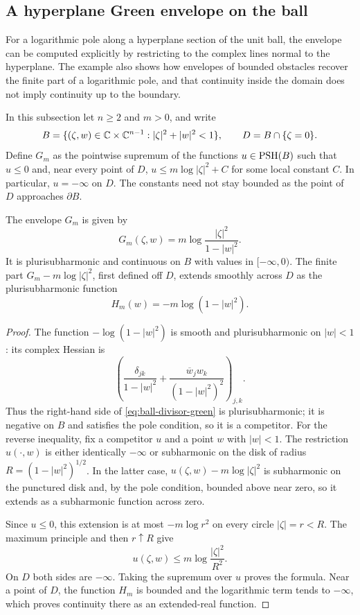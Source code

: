 \subsection{A hyperplane Green envelope on the ball}
\label{subsec:ball-divisor-green}

For a logarithmic pole along a hyperplane section of the unit ball, the envelope can be computed explicitly by restricting to the complex lines normal to the hyperplane. The example also shows how envelopes of bounded obstacles recover the finite part of a logarithmic pole, and that continuity inside the domain does not imply continuity up to the boundary.

In this subsection let $n\geq2$ and $m>0$, and write
\[
 B=\{(\zeta,w)\in\mathbb C\times\mathbb C^{n-1}:|\zeta|^2+|w|^2<1\},
 \qquad D=B\cap\{\zeta=0\}.
\]
Define $G_m$ as the pointwise supremum of the functions $u\in\mathrm{PSH}(B)$ such that $u\leq0$ and, near every point of $D$, $u\leq m\log|\zeta|^2+C$ for some local constant $C$. In particular, $u=-\infty$ on $D$. The constants need not stay bounded as the point of $D$ approaches $\partial B$.

\begin{proposition}\label{prop:ball-divisor-green}
The envelope $G_m$ is given by
\begin{equation}\label{eq:ball-divisor-green}
 G_m(\zeta,w)=m\log\frac{|\zeta|^2}{1-|w|^2}.
\end{equation}
It is plurisubharmonic and continuous on $B$ with values in $[-\infty,0)$. The finite part $G_m-m\log|\zeta|^2$, first defined off $D$, extends smoothly across $D$ as the plurisubharmonic function
\[
 H_m(w)=-m\log(1-|w|^2).
\]
\end{proposition}
\begin{proof}
The function $-\log(1-|w|^2)$ is smooth and plurisubharmonic on $|w|<1$: its complex Hessian is
\[
 \left(\frac{\delta_{jk}}{1-|w|^2}
       +\frac{\overline w_jw_k}{(1-|w|^2)^2}\right)_{j,k}.
\]
Thus the right-hand side of \eqref{eq:ball-divisor-green} is plurisubharmonic; it is negative on $B$ and satisfies the pole condition, so it is a competitor. For the reverse inequality, fix a competitor $u$ and a point $w$ with $|w|<1$. The restriction $u(\cdot,w)$ is either identically $-\infty$ or subharmonic on the disk of radius $R=(1-|w|^2)^{1/2}$. In the latter case, $u(\zeta,w)-m\log|\zeta|^2$ is subharmonic on the punctured disk and, by the pole condition, bounded above near zero, so it extends as a subharmonic function across zero.

Since $u\leq0$, this extension is at most $-m\log r^2$ on every circle $|\zeta|=r<R$. The maximum principle and then $r\uparrow R$ give
\[
 u(\zeta,w)\leq m\log\frac{|\zeta|^2}{R^2}.
\]
On $D$ both sides are $-\infty$. Taking the supremum over $u$ proves the formula. Near a point of $D$, the function $H_m$ is bounded and the logarithmic term tends to $-\infty$, which proves continuity there as an extended-real function.
\end{proof}

